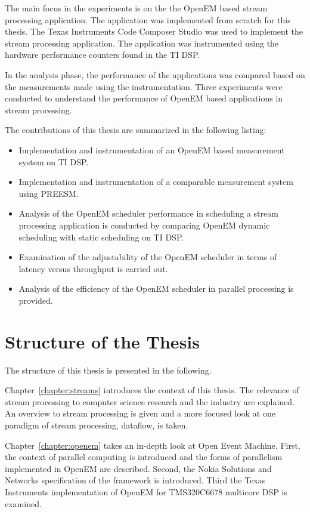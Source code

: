 The main focus in the experiments is on the the OpenEM based stream processing application. The application was implemented from scratch for this thesis. The Texas Instruments Code Composer Studio was used to implement the stream processing application. The application was instrumented using the hardware performance counters found in the TI DSP.

In the analysis phase, the performance of the applications was compared based on the measurements made using the instrumentation. Three experiments were conducted to understand the performance of OpenEM based applications in stream processing.

The contributions of this thesis are summarized in the following listing:
\begin{itemize}
    \item Implementation and instrumentation of an OpenEM based measurement system on TI DSP.
    \item Implementation and instrumentation of a comparable measurement system using PREESM.
    \item Analysis of the OpenEM scheduler performance in scheduling a stream processing application is conducted by comparing OpenEM dynamic scheduling with static scheduling on TI DSP.
    \item Examination of the adjustability of the OpenEM scheduler in terms of latency versus throughput is carried out.
    \item Analysis of the efficiency of the OpenEM scheduler in parallel processing is provided.
\end{itemize}

\section{Structure of the Thesis}
\label{section:structure}
The structure of this thesis is presented in the following.

Chapter~\ref{chapter:streams} introduces the context of this thesis. The relevance of stream processing to computer science research and the industry are explained. An overview to stream processing is given and a more focused look at one paradigm of stream processing, dataflow, is taken.

Chapter~\ref{chapter:openem} takes an in-depth look at Open Event Machine. First, the context of parallel computing is introduced and the forms of parallelism implemented in OpenEM are described. Second, the Nokia Solutions and Networks specification of the framework is introduced. Third the Texas Instruments implementation of OpenEM for TMS320C6678 multicore DSP is examined.

